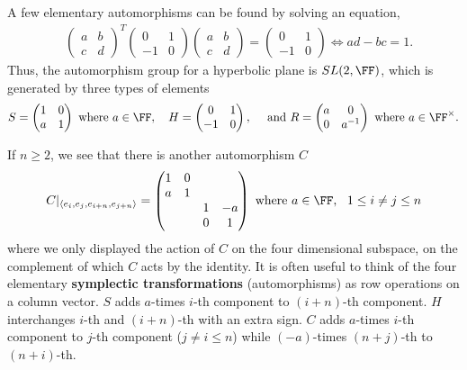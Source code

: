 A few elementary automorphisms can be found by solving an equation,
\begin{align}
&\begin{pmatrix}
a & b \\ c & d
\end{pmatrix}^T
\begin{pmatrix}
0 & 1 \\ -1 & 0
\end{pmatrix}
\begin{pmatrix}
a & b \\ c & d
\end{pmatrix}
=
\begin{pmatrix}
0 & 1 \\ -1 & 0
\end{pmatrix} \Leftrightarrow 
ad-bc = 1.
\end{align}
Thus, the automorphism group for a hyperbolic plane is $SL(2,\FF)$,
which is generated by three types of elements
\begin{align}
S = \begin{pmatrix}
 1 & 0 \\ a & 1
\end{pmatrix}
\text{ where } a \in \FF, \quad
H = \begin{pmatrix}
 0 & 1 \\ -1 & 0
\end{pmatrix},\quad \text{ and }
R = \begin{pmatrix}
 a & 0 \\ 0 & a^{-1}
\end{pmatrix}
\text{ where } a \in \FF^\times .
\label{ElementaryZeroDSymplecticTransformation}
\end{align}

If $n \ge 2$, we see that there is another automorphism $C$
\begin{align}
 C|_{\langle e_i , e_j , e_{i+n} , e_{j+n} \rangle } = 
\begin{pmatrix}
 1 & 0 & & \\
 a & 1 & & \\
  &  & 1 & -a \\
  &  & 0 & 1
\end{pmatrix} \text{ where } a \in \FF, ~~1 \le i \neq j \le n
\label{CNOT}
\end{align}
where we only displayed the action of $C$ on the four dimensional subspace,
on the complement of which $C$ acts by the identity.
It is often useful to think of the four elementary {\bf symplectic transformations}
(automorphisms)
as row operations on a column vector.
$S$ adds $a$-times $i$-th component to $(i+n)$-th component.
$H$ interchanges $i$-th and $(i+n)$-th with an extra sign.
$C$ adds $a$-times $i$-th component to $j$-th component ($j \neq i \le n$)
while $(-a)$-times $(n+j)$-th to $(n+i)$-th.

